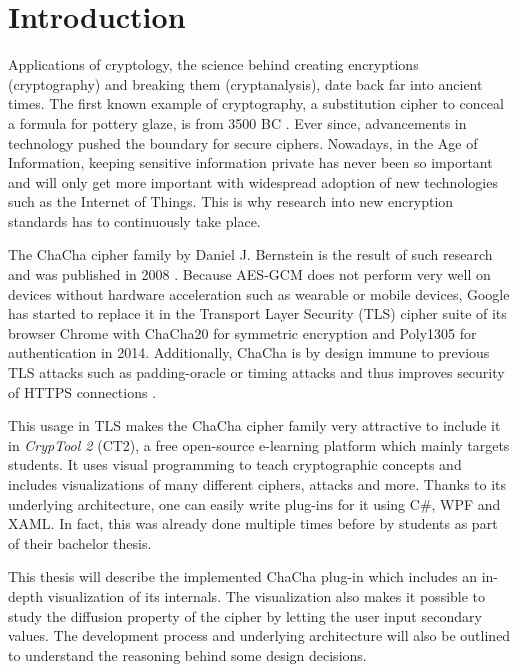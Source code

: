 
\chapter{Introduction}

Applications of cryptology, the science behind creating encryptions (cryptography) and breaking them (cryptanalysis), date back far into ancient times. The first known example of  cryptography, a substitution cipher to conceal a formula for pottery glaze, is from 3500 BC \cite{history}. Ever since, advancements in technology pushed the boundary for secure ciphers. Nowadays, in the Age of Information, keeping sensitive information private has never been so important and will only get more important with widespread adoption of new technologies such as the Internet of Things. This is why research into new encryption standards has to continuously take place.

The ChaCha cipher family by Daniel J. Bernstein is the result of such research and was published in 2008 \cite{chachaspec}. Because AES-GCM does not perform very well on devices without hardware acceleration such as wearable or mobile devices, Google has started to replace it in the Transport Layer Security (TLS) cipher suite of its browser Chrome with ChaCha20 for symmetric encryption and Poly1305 for authentication in 2014. Additionally, ChaCha is by design immune to previous TLS attacks such as padding-oracle or timing attacks and thus improves security of HTTPS connections \cite{googlesecurityblog}.

This usage in TLS makes the ChaCha cipher family very attractive to include it in \textit{CrypTool 2} (CT2), a free open-source e-learning platform which mainly targets students. It uses visual programming to teach cryptographic concepts and includes visualizations of many different ciphers, attacks and more. Thanks to its underlying architecture, one can easily write plug-ins for it using C\#, WPF and XAML. In fact, this was already done multiple times before by students as part of their bachelor thesis.

This thesis will describe the implemented ChaCha plug-in which includes an in-depth visualization of its internals. The visualization also makes it possible to study the diffusion property of the cipher by letting the user input secondary values. The development process and underlying architecture will also be outlined to understand the reasoning behind some design decisions.